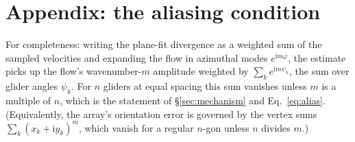 \documentclass[11pt]{article}
\begin{document}
\appendix
\section*{Appendix: the aliasing condition}
\label{sec:appendix}

For completeness: writing the plane-fit divergence as a weighted sum of the sampled velocities
and expanding the flow in azimuthal modes $e^{\mathrm i m\varphi}$, the estimate picks up the
flow's wavenumber-$m$ amplitude weighted by $\sum_k e^{\mathrm i m\psi_k}$, the sum over glider
angles $\psi_k$. For $n$ gliders at equal spacing this sum vanishes unless $m$ is a multiple of
$n$, which is the statement of \S\ref{sec:mechanism} and Eq.~\eqref{eq:alias}. (Equivalently,
the array's orientation error is governed by the vertex sums $\sum_k (x_k+\mathrm i y_k)^m$,
which vanish for a regular $n$-gon unless $n$ divides $m$.)
\end{document}
